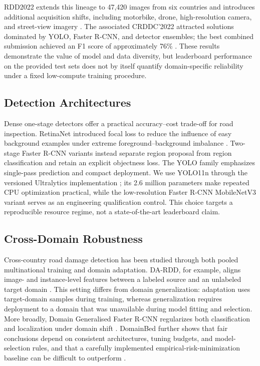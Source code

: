 \documentclass[conference]{ieee-template/vendor/IEEEtran/IEEEtran}
\begin{document}
RDD2022 extends this lineage to 47,420 images from six countries and introduces
additional acquisition shifts, including motorbike, drone, high-resolution
camera, and street-view imagery \cite{arya2024rdd2022}. The associated
CRDDC'2022 attracted solutions dominated by YOLO, Faster R-CNN, and detector
ensembles; the best combined submission achieved an F1 score of approximately
76\% \cite{arya2022crddc}. These results demonstrate the value of model and
data diversity, but leaderboard performance on the provided test sets does not
by itself quantify domain-specific reliability under a fixed low-compute
training procedure.

\subsection{Detection Architectures}
Dense one-stage detectors offer a practical accuracy--cost trade-off for road
inspection. RetinaNet introduced focal loss to reduce the influence of easy
background examples under extreme foreground--background imbalance
\cite{lin2017focal}. Two-stage Faster R-CNN variants instead separate region
proposal from region classification and retain an explicit objectness loss.
The YOLO family emphasizes single-pass prediction and compact deployment. We
use YOLO11n through the versioned Ultralytics implementation
\cite{jocher2025ultralytics}; its 2.6 million parameters make repeated CPU
optimization practical, while the low-resolution Faster R-CNN MobileNetV3
variant serves as an engineering qualification control. This choice targets a
reproducible resource regime, not a state-of-the-art leaderboard claim.

\subsection{Cross-Domain Robustness}
Cross-country road damage detection has been studied through both pooled
multinational training and domain adaptation. DA-RDD, for example, aligns
image- and instance-level features between a labeled source and an unlabeled
target domain \cite{lin2023darDD}. This setting differs from domain
generalization: adaptation uses target-domain samples during training, whereas
generalization requires deployment to a domain that was unavailable during
model fitting and selection. More broadly, Domain Generalised Faster R-CNN
regularizes both classification and localization under domain shift
\cite{seemakurthy2023dgfrcnn}. DomainBed further shows that fair conclusions
depend on consistent architectures, tuning budgets, and model-selection rules,
and that a carefully implemented empirical-risk-minimization baseline can be
difficult to outperform \cite{gulrajani2021domainbed}.
\end{document}

